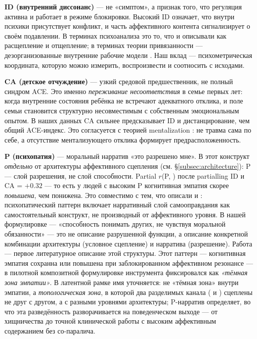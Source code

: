 \textbf{ID (внутренний диссонанс)} --- не «симптом», а признак того, что регуляция активна и работает в режиме блокировки. Высокий ID означает, что внутри психики присутствует конфликт, и часть аффективного контента сигнализирует о своём подавлении. В терминах психоанализа это то, что \citet{ferenczi1933} и \citet{klein1946} описывали как расщепление и отщепление; в терминах теории привязанности --- дезорганизованные внутренние рабочие модели \citep{main1986}. Наш вклад --- психометрическая координата, которую можно измерить, воспроизвести и соотносить с исходами.

\textbf{CA (детское отчуждение)} --- узкий средовой предшественник, не полный синдром ACE. Это именно \emph{переживание несоответствия} в семье первых лет: когда внутренние состояния ребёнка не встречают адекватного отклика, и поле семьи становится структурно несовместимым с собственным эмоциональным опытом. В наших данных CA сильнее предсказывает ID и дистанцирование, чем общий ACE-индекс. Это согласуется с теорией mentalization \citep{fonagy2002}: не травма сама по себе, а отсутствие ментализующего отклика формирует предрасположенность.

\textbf{P (психопатия)} --- моральный нарратив «это разрешено мне». В \DEIC{} этот конструкт \emph{отдельно} от архитектуры аффективного сцепления (см. §\ref{subsec:architecture}): P --- слой разрешения, не слой способности. Partial $r$(P, \Ecog{}) после partialling ID и CA = $+0.32$ --- то есть у людей с высоким P когнитивная эмпатия скорее \emph{повышена}, чем понижена. Это совместимо с тем, что описали \citet{blair1995, blair2013} и \citet{baroncohen2011}: психопатический паттерн включает нарративный слой самооправдания как самостоятельный конструкт, не производный от аффективного уровня. В нашей формулировке --- «способность понимать других, не чувствуя моральной обязанности» --- это не описание разрушенной функции, а описание конкретной комбинации архитектуры (условное сцепление) и нарратива (разрешение). Работа \citet{cleckley1941} --- первое литературное описание этой структуры. Этот паттерн --- когнитивная эмпатия сохранна или повышена при заблокированном аффективном резонансе --- в пилотной композитной формулировке инструмента фиксировался как \emph{«тёмная зона эмпатии»}. В латентной рамке имя уточняется: не «тёмная зона» внутри эмпатии, а \emph{топологическая зона}, в которой два разделимых канала (\Ecog{} и \EAF{}) сцеплены не друг с другом, а с разными уровнями архитектуры; P-нарратив определяет, во что эта разведённость разворачивается на поведенческом выходе --- от хищничества до точной клинической работы с высоким аффективным содержанием без со-паралича.


